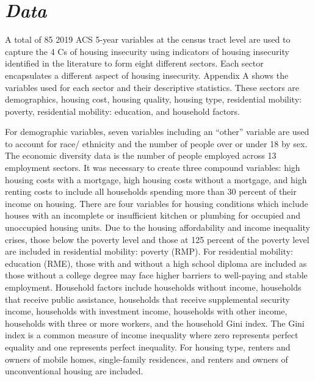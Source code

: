 \section{\textit{Data}}

A total of 85 2019 ACS 5-year variables at the census tract level are used to capture the 4 Cs of housing insecurity using indicators of housing insecurity identified in the literature to form eight different sectors. Each sector encapsulates a different aspect of housing insecurity. Appendix A shows the variables used for each sector and their descriptive statistics. These sectors are demographics, housing cost, housing quality, housing type, residential mobility: poverty, residential mobility: education, and household factors.


For demographic variables, seven variables including an “other” variable are used to account for race/ ethnicity and the number of people over or under 18 by sex. The economic diversity data is the number of people employed across 13 employment sectors. It was necessary to create three compound variables: high housing costs with a mortgage, high housing costs without a mortgage, and high renting costs to include all households spending more than 30 percent of their income on housing. There are four variables for housing conditions which include houses with an incomplete or insufficient kitchen or plumbing for occupied and unoccupied housing units.  Due to the housing affordability and income inequality crises, those below the poverty level and those at 125 percent of the poverty level are included in residential mobility: poverty (RMP). For residential mobility: education (RME), those with and without a high school diploma are included as those without a college degree may face higher barriers to well-paying and stable employment. Household factors include households without income, households that receive public assistance, households that receive supplemental security income, households with investment income, households with other income, households with three or more workers, and the household Gini index. The Gini index is a common measure of income inequality where zero represents perfect equality and one represents perfect inequality. For housing type,  renters and owners of mobile homes, single-family residences, and renters and owners of unconventional housing are included. 



